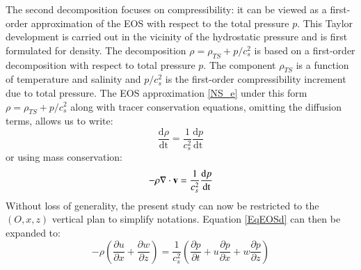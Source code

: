\documentclass[a4paper,11pt]{article}
\begin{document}
The second decomposition focuses on compressibility: it can be viewed as a first-order approximation of the EOS with respect to the total pressure $p$. This Taylor development is carried out in the vicinity of the hydrostatic pressure and is first formulated for density. The decomposition $\rho=\rho_{TS}+p/c_s^2$ is based on a first-order decomposition with respect to total pressure $p$. The component $\rho_{TS}$ is a function of temperature and salinity and $p/c_s^2$ is the first-order compressibility increment due to total pressure. The EOS approximation \ref{NS_e} under this form $\rho=\rho_{TS}+p/c_s^2$ along with tracer conservation equations, omitting the diffusion terms, allows us to write:
%
\begin{equation}
	 \frac{\textrm{d}\rho}{\textrm{dt}}=
	\frac{1}{c_s^2}  \frac{\textrm{d} p}{\textrm{dt}}
\end{equation}
%
or using mass conservation:
%
\begin{equation}
	-\rho \nabla \cdot {\bf v} =
	\frac{1}{c_s^2}  \frac{\textrm{d} p}{\textrm{dt}}
	\label{EqEOSd}
\end{equation}
%
Without loss of generality, the present study can now be restricted to the $(O, x, z)$ vertical plan to simplify notations. Equation \ref{EqEOSd} can then be expanded to:
%
\begin{equation}
	- \rho \left(\frac{\partial u}{\partial x}
	+\frac{\partial w}{\partial z}
	\right)=
	\frac{1}{c_s^2}\left(\frac{\partial p}{\partial t} 
	 +u \frac{\partial p}{\partial x}
	 +w \frac{\partial p}{\partial z}\right)
	 \label{EqEOSd1}
\end{equation}
%
\end{document}
